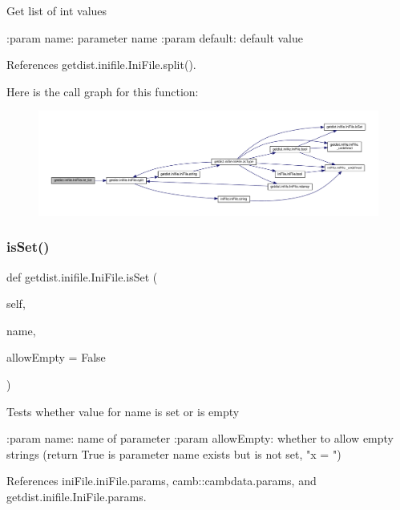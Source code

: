 \begin{DoxyVerb}Get list of int values

:param name: parameter name
:param default: default value
\end{DoxyVerb}
 

References getdist.\+inifile.\+Ini\+File.\+split().

Here is the call graph for this function\+:
\nopagebreak
\begin{figure}[H]
\begin{center}
\leavevmode
\includegraphics[width=350pt]{classgetdist_1_1inifile_1_1IniFile_a2662f801bfbe7d2a7e20c4f734318a69_cgraph}
\end{center}
\end{figure}
\mbox{\label{classgetdist_1_1inifile_1_1IniFile_a12654a2e6bfd201d99e277bd6e1c6125}} 
\subsubsection{\texorpdfstring{is\+Set()}{isSet()}}
{\footnotesize\ttfamily def getdist.\+inifile.\+Ini\+File.\+is\+Set (\begin{DoxyParamCaption}\item[{}]{self,  }\item[{}]{name,  }\item[{}]{allow\+Empty = {\ttfamily False} }\end{DoxyParamCaption})}

\begin{DoxyVerb}Tests whether value for name is set or is empty

:param name: name of parameter
:param allowEmpty: whether to allow empty strings (return True is parameter name exists but is not set, "x = ")
\end{DoxyVerb}
 

References ini\+File.\+ini\+File.\+params, camb\+::cambdata.\+params, and getdist.\+inifile.\+Ini\+File.\+params.



